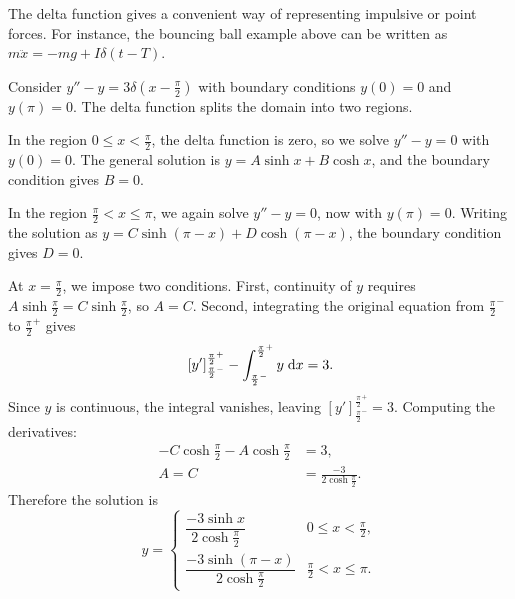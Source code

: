 \documentclass[a4paper]{article}
\begin{document}
\begin{remark}
  The delta function gives a convenient way of representing impulsive or point forces. For instance, the bouncing ball example above can be written as $m\ddot x = -mg + I\delta(t - T)$.
\end{remark}

\begin{eg}
  Consider $y'' - y = 3\delta(x - \frac{\pi}{2})$ with boundary conditions $y(0) = 0$ and $y(\pi) = 0$. The delta function splits the domain into two regions.

  In the region $0 \leq x < \frac{\pi}{2}$, the delta function is zero, so we solve $y'' - y = 0$ with $y(0) = 0$. The general solution is $y = A\sinh x + B\cosh x$, and the boundary condition gives $B = 0$.

  In the region $\frac{\pi}{2} < x \leq \pi$, we again solve $y'' - y = 0$, now with $y(\pi) = 0$. Writing the solution as $y = C\sinh(\pi - x) + D\cosh(\pi - x)$, the boundary condition gives $D = 0$.

  At $x = \frac{\pi}{2}$, we impose two conditions. First, continuity of $y$ requires $A\sinh\frac{\pi}{2} = C\sinh\frac{\pi}{2}$, so $A = C$. Second, integrating the original equation from $\frac{\pi}{2}^-$ to $\frac{\pi}{2}^+$ gives
  \[
    [y']^{\frac{\pi}{2}^+}_{\frac{\pi}{2}^-} - \int_{\frac{\pi}{2}^-}^{\frac{\pi}{2}^+} y\;\mathrm{d} x = 3.
  \]
  Since $y$ is continuous, the integral vanishes, leaving $[y']^{\frac{\pi}{2}^+}_{\frac{\pi}{2}^-} = 3$. Computing the derivatives:
  \begin{align*}
    -C\cosh \frac{\pi}{2} - A\cosh\frac{\pi}{2} &= 3,\\
    A = C &= \frac{-3}{2\cosh \frac{\pi}{2}}.
  \end{align*}
  Therefore the solution is
  \[
    y =
    \begin{cases}
      \dfrac{-3\sinh x}{2\cosh \frac{\pi}{2}} & 0 \leq x < \frac{\pi}{2},\\[6pt]
      \dfrac{-3\sinh(\pi - x)}{2\cosh \frac{\pi}{2}} & \frac{\pi}{2} < x \leq \pi.
    \end{cases}
  \]
  \begin{center}
  \end{center}
\end{eg}
\end{document}
